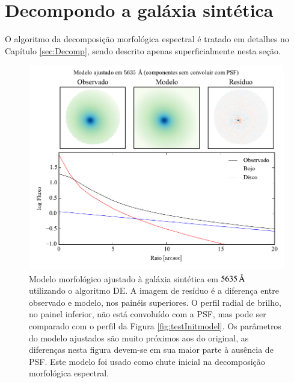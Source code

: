 \section{Decompondo a galáxia sintética}

O algoritmo da decomposição morfológica espectral é tratado em detalhes no
Capítulo \ref{sec:Decomp}, sendo descrito apenas superficialmente nesta seção.

\begin{figure}
	\includegraphics{figuras/simulation_fitmodel}
	\caption[Modelo morfológico inicial do ajuste da galáxia sintética.]
	{Modelo morfológico ajustado à galáxia sintética em $5635\,\text{\normalfont\AA}$
	utilizando o algoritmo DE. A imagem de resíduo é a diferença entre
	observado e modelo, nos painéis superiores. O perfil radial de brilho, no
	painel inferior, não está convoluído com a PSF, mas pode ser comparado com o
	perfil da Figura \ref{fig:testInitmodel}.
	Os parâmetros do modelo ajustados são muito próximos aos do original, as
	diferenças nesta figura devem-se em sua maior parte à ausência de PSF. Este
	modelo foi usado como chute inicial na decomposição morfológica espectral.}
	\label{fig:testFitmodel}
\end{figure}

